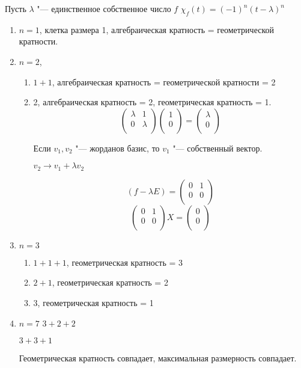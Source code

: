 \begin{exmp}
Пусть $\lambda$ "--- единственное собственное число $f$ $\chi_f(t) = (-1)^{n}(t - \lambda)^n$
\begin{enumerate}
\item $n = 1$, клетка размера 1, алгебраическая кратность  = геометрической кратности.
\item $n = 2$, 
\begin{enumerate}
\item $1 + 1$, алгебраическая кратность  = геометрической кратности = 2
\item 2, алгебраическая кратность = 2, геометрическая кратность = 1.
$$
\begin{pmatrix}
\lambda & 1\\
0&\lambda\\
\end{pmatrix} \begin{pmatrix}
1\\
0\\
\end{pmatrix}
= \begin{pmatrix}
\lambda\\
0\\
\end{pmatrix}
$$

Если $v_1, v_2$ "--- жорданов базис, то $v_1$ "--- собственный вектор.

$v_2 \to v_1 + \lambda v_2$

$$(f - \lambda E) = \begin{pmatrix}
0&1\\
0&0\\
\end{pmatrix}$$
$$
\begin{pmatrix}
0&1\\
0&0\\
\end{pmatrix} X = \begin{pmatrix}
0\\
0\\
\end{pmatrix}
$$
\end{enumerate}

\item $n = 3$
\begin{enumerate}
\item $1 + 1 + 1$, геометрическая кратность = 3
\item $2 + 1$, геометрическая кратность = 2
\item 3, геометрическая кратность = 1
\end{enumerate}

\item $n = 7$
$3 + 2 + 2$

$3 + 3 + 1$

Геометрическая кратность совпадает, максимальная размерность совпадает.
\end{enumerate}
\end{exmp}

